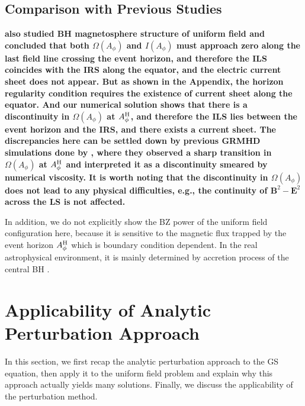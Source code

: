 \documentclass[iop,apj]{emulateapj}
\def\AB{A_\phi^{\rm H}}
\begin{document}
\subsection{Comparison with Previous Studies}

{\bf \citet{Nathanail2014} also studied BH magnetosphere structure of uniform field and concluded that
both $\Omega(A_\phi)$ and $I(A_\phi)$ must approach zero along the last field line crossing the event horizon,
and therefore the ILS coincides with the IRS along the equator,
and the electric current sheet does not appear. But as shown in the Appendix, the horizon regularity condition
requires the existence of current sheet along the equator. And our numerical solution shows that there is
a discontinuity in $\Omega(A_\phi)$ at $\AB$, and therefore the ILS lies between the event horizon
and the IRS, and there exists a current sheet.
The discrepancies here can be settled down by previous GRMHD simulations done by \citet{Komissarov2005},
where they observed a sharp transition in $\Omega(A_\phi)$ at $\AB$ and interpreted it as a discontinuity
smeared by numerical viscosity. It is worth noting that the discontinuity in $\Omega(A_\phi)$ does not lead to
any physical difficulties, e.g., the continuity of $\bm B^2- \bm E^2$ across the LS is not affected.

In addition, we do not explicitly show the BZ power of the uniform field configuration here,
because it is sensitive to the magnetic flux trapped by the event horizon $\AB$ which is boundary condition dependent.
In the real astrophysical environment, it is mainly determined by accretion process of the
central BH \citep[e.g.][]{Garofalo2009}. }






\section{Applicability of Analytic Perturbation Approach}
\label{sec:pert}
In this section, we first recap the analytic perturbation approach to the GS equation,
then apply it to the uniform field problem \citep{Pan2014, Pan2015b} and explain
why this approach actually yields many solutions.
Finally, we discuss the applicability of the perturbation method.
\end{document}
